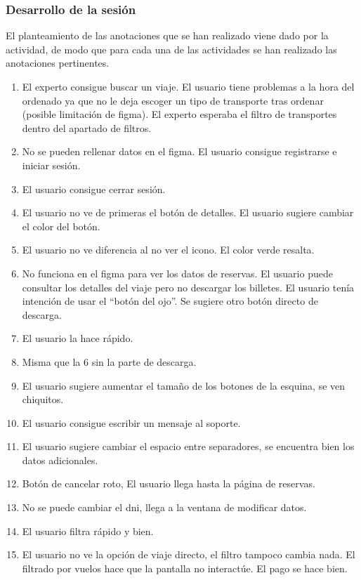 \subsubsection{Desarrollo de la sesión}
El planteamiento de las anotaciones que se han realizado viene dado por la actividad, de modo que para cada una de las actividades se han realizado las anotaciones pertinentes.
\begin{enumerate}
    \item El experto consigue buscar un viaje. El usuario tiene problemas  a la hora del ordenado ya que no le deja escoger un tipo de transporte tras ordenar (posible limitación de figma). El experto esperaba el filtro de transportes dentro del apartado de filtros.
    \item No se pueden rellenar datos en el figma. El usuario consigue registrarse e iniciar sesión.
    \item El usuario consigue cerrar sesión.
    \item El usuario no ve de primeras el botón de detalles. El usuario sugiere cambiar el color del botón.
    \item El usuario no ve diferencia al no ver el icono. El color verde resalta.
    \item No funciona en el figma para ver los datos de reservas. El usuario puede consultar los detalles del viaje pero no descargar los billetes. El usuario tenía intención de usar el “botón del ojo”. Se sugiere otro botón directo de descarga.
    \item El usuario la hace rápido.
    \item Misma que la 6 sin la parte de descarga.
    \item El usuario sugiere aumentar el tamaño de los botones de la esquina, se ven chiquitos.
    \item El usuario consigue escribir un mensaje al soporte.
    \item El usuario sugiere cambiar el espacio entre separadores, se encuentra bien los datos adicionales.
    \item Botón de cancelar roto, El usuario llega hasta la página de reservas.
    \item No se puede cambiar el dni, llega a la ventana de modificar datos.
    \item El usuario filtra rápido y bien.
    \item El usuario no ve la opción de viaje directo, el filtro tampoco cambia nada. El filtrado por vuelos hace que la pantalla no interactúe. El pago se hace bien.

\end{enumerate}
